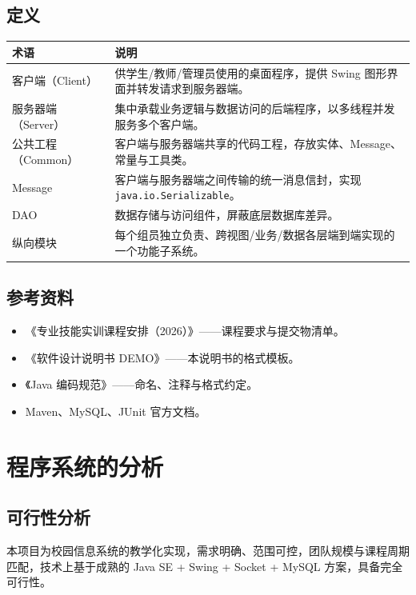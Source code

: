 \documentclass[12pt,a4paper]{ctexart}
\begin{document}
\subsection{定义}
\begin{longtable}{l p{10cm}}
\toprule
\textbf{术语} & \textbf{说明} \\
\midrule
\endhead
客户端（Client） & 供学生/教师/管理员使用的桌面程序，提供 Swing 图形界面并转发请求到服务器端。 \\
服务器端（Server） & 集中承载业务逻辑与数据访问的后端程序，以多线程并发服务多个客户端。 \\
公共工程（Common） & 客户端与服务器端共享的代码工程，存放实体、Message、常量与工具类。 \\
Message & 客户端与服务器端之间传输的统一消息信封，实现 \texttt{java.io.Serializable}。 \\
DAO & 数据存储与访问组件，屏蔽底层数据库差异。 \\
纵向模块 & 每个组员独立负责、跨视图/业务/数据各层端到端实现的一个功能子系统。 \\
\bottomrule
\end{longtable}

\subsection{参考资料}
\begin{itemize}
  \item 《专业技能实训课程安排（2026）》——课程要求与提交物清单。
  \item 《软件设计说明书 DEMO》——本说明书的格式模板。
  \item 《Java 编码规范》——命名、注释与格式约定。
  \item Maven、MySQL、JUnit 官方文档。
\end{itemize}

\section{程序系统的分析}

\subsection{可行性分析}
本项目为校园信息系统的教学化实现，需求明确、范围可控，团队规模与课程周期匹配，技术上基于成熟的 Java SE + Swing + Socket + MySQL 方案，具备完全可行性。
\end{document}
